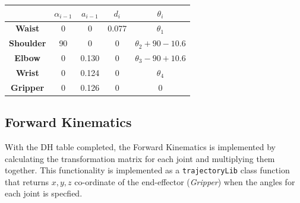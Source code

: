 \documentclass[9pt, a4paper]{article}
\begin{document}
\begin{table}[h]
    \centering
    \begin{tabular}{|c|c|c|c|c|}
    \hline
    {\textbf{}} & {\textbf{$\alpha_{i-1}$}} & { \textbf{$a_{i-1}$}} & { \textbf{$d_i$}} & { \textbf{$\theta_i$}} \\ \hline
    \textbf{Waist}           & 0                             & 0                        & 0.077                & $\theta_1$                \\ \hline
    \textbf{Shoulder}           & 90                            & 0                        & 0                    & $\theta_2 + 90 - 10.6$    \\ \hline
    \textbf{Elbow}           & 0                             & 0.130                    & 0                    & $\theta_3 - 90 + 10.6$    \\ \hline
    \textbf{Wrist}           & 0                             & 0.124                    & 0                    & $\theta_4$                \\ \hline
    \textbf{Gripper}           & 0                             & 0.126                    & 0                    & 0                         \\ \hline
    \end{tabular}
\end{table}

\subsection{Forward Kinematics}

With the DH table completed, the Forward Kinematics is implemented by
calculating the transformation matrix for each joint and multiplying them
together. This functionality is implemented as a \verb+trajectoryLib+ class
function that returns $x,y,z$ co-ordinate of the end-effector (\textit{Gripper})
when the angles for each joint is specfied. 
\end{document}
